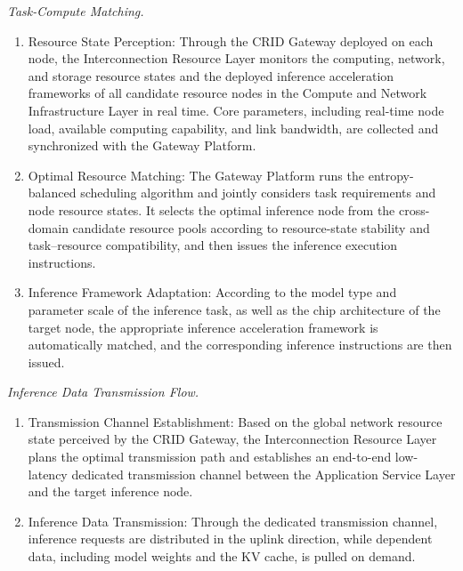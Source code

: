 \documentclass{ccjnl}
\begin{document}
\par
{}
\noindent\textit{Task-Compute Matching.}\par

\begin{enumerate}[nosep,label=\arabic*)]
	\item Resource State Perception: Through the CRID Gateway deployed on each node, the Interconnection Resource Layer monitors the computing, network, and storage resource states and the deployed inference acceleration frameworks of all candidate resource nodes in the Compute and Network Infrastructure Layer in real time. Core parameters, including real-time node load, available computing capability, and link bandwidth, are collected and synchronized with the Gateway Platform.
	
	\item Optimal Resource Matching: The Gateway Platform runs the entropy-balanced scheduling algorithm and jointly considers task requirements and node resource states. It selects the optimal inference node from the cross-domain candidate resource pools according to resource-state stability and task--resource compatibility, and then issues the inference execution instructions.
	
	\item Inference Framework Adaptation: According to the model type and parameter scale of the inference task, as well as the chip architecture of the target node, the appropriate inference acceleration framework is automatically matched, and the corresponding inference instructions are then issued.
\end{enumerate}

\par
{}
\noindent\textit{Inference Data Transmission Flow.}\par

\begin{enumerate}[nosep,label=\arabic*)]
	\item Transmission Channel Establishment: Based on the global network resource state perceived by the CRID Gateway, the Interconnection Resource Layer plans the optimal transmission path and establishes an end-to-end low-latency dedicated transmission channel between the Application Service Layer and the target inference node.
	
	\item Inference Data Transmission: Through the dedicated transmission channel, inference requests are distributed in the uplink direction, while dependent data, including model weights and the KV cache, is pulled on demand.
\end{enumerate}
\end{document}
